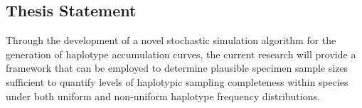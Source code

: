 \subsection{Thesis Statement}

Through the development of a novel stochastic simulation algorithm for the generation of haplotype accumulation curves, the current research will provide a framework that can be employed to determine plausible specimen sample sizes sufficient to quantify levels of haplotypic sampling completeness within species under both uniform and non-uniform haplotype frequency distributions.



  
